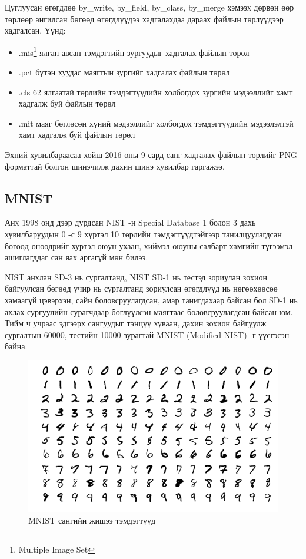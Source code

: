 Цуглуусан өгөгдлөө by\_write, by\_field, by\_class, by\_merge хэмээх дөрвөн өөр төрлөөр ангилсан бөгөөд өгөгдлүүдээ хадгалахдаа дараах файлын төрлүүдээр хадгалсан. Үүнд:
\begin{itemize}
	\item .mis\footnote{Multiple Image Set} ялган авсан тэмдэгтийн зургуудыг хадгалах файлын төрөл
	\item .pct бүтэн хуудас маягтын зургийг хадгалах файлын төрөл
	\item .cls 62 ялгаатай төрлийн тэмдэгтүүдийн холбогдох зургийн мэдээллийг хамт хадгалж буй файлын төрөл
	\item .mit маяг бөглөсөн хүний мэдээллийг холбогдох тэмдэгтүүдийн мэдээлэлтэй хамт хадгалж буй файлын төрөл
\end{itemize}

Эхний хувилбараасаа хойш 2016 оны 9 сард санг хадгалах файлын төрлийг PNG форматтай болгон шинэчилж дахин шинэ хувилбар гаргажээ.

\subsection{MNIST \cite{mnist}}

Анх 1998 онд дээр дурдсан NIST -н Special Database 1 болон 3 дахь хувилбаруудын 0 -с 9 хүртэл 10 төрлийн тэмдэгтүүдтэйгээр танилцуулагдсан бөгөөд өнөөдрийг хуртэл оюун ухаан, хиймэл оюуны салбарт хамгийн түгээмэл ашиглагддаг сан яах аргагүй мөн билээ.

NIST анхлан SD-3 нь сургалтанд, NIST SD-1 нь тестэд зориулан зохион байгуулсан бөгөөд учир нь сургалтанд зориулсан өгөгдлүүд нь нөгөөхөөсөө хамаагүй цэвэрхэн, сайн боловсруулагдсан, амар танигдахаар байсан бол SD-1 нь ахлах сургуулийн сурагчдаар бөглүүлсэн маягтаас боловсруулагдсан байсан юм. Тийм ч учраас эдгээрх сангуудыг тэнцүү хуваан, дахин зохион байгуулж сургалтын 60000, тестийн 10000 зурагтай MNIST (Modified NIST) -г үүсгэсэн байна.\cite{mnist-paper}

\begin{figure}[H]
	\centering
	\includegraphics[width=0.9\linewidth]{images/mnist}
	\caption{MNIST сангийн жишээ тэмдэгтүүд \cite{mnist}}
	\label{fig:mnist-sample}
\end{figure}

